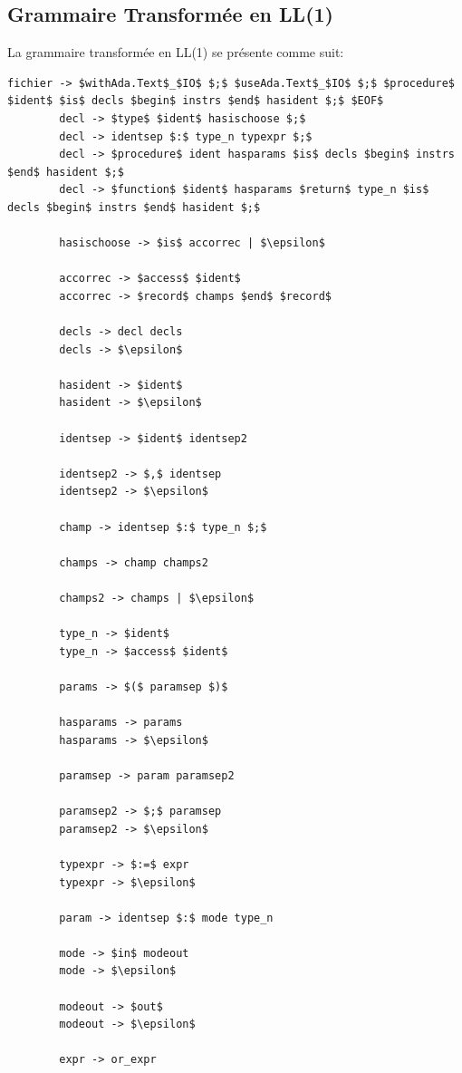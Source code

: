 \documentclass[french,a4paper]{article}
\begin{document}
    \subsection{Grammaire Transformée en LL(1)}\label{subsec:grammaire-transformee-en-ll(1)}
    La grammaire transformée en LL(1) se présente comme suit:
    \begin{lstlisting}[label={lst:lstlisting9}]
        fichier -> $withAda.Text$_$IO$ $;$ $useAda.Text$_$IO$ $;$ $procedure$ $ident$ $is$ decls $begin$ instrs $end$ hasident $;$ $EOF$
        decl -> $type$ $ident$ hasischoose $;$
        decl -> identsep $:$ type_n typexpr $;$
        decl -> $procedure$ ident hasparams $is$ decls $begin$ instrs $end$ hasident $;$
        decl -> $function$ $ident$ hasparams $return$ type_n $is$ decls $begin$ instrs $end$ hasident $;$

        hasischoose -> $is$ accorrec | $\epsilon$

        accorrec -> $access$ $ident$
        accorrec -> $record$ champs $end$ $record$

        decls -> decl decls
        decls -> $\epsilon$

        hasident -> $ident$
        hasident -> $\epsilon$

        identsep -> $ident$ identsep2

        identsep2 -> $,$ identsep
        identsep2 -> $\epsilon$

        champ -> identsep $:$ type_n $;$

        champs -> champ champs2

        champs2 -> champs | $\epsilon$

        type_n -> $ident$
        type_n -> $access$ $ident$

        params -> $($ paramsep $)$

        hasparams -> params
        hasparams -> $\epsilon$

        paramsep -> param paramsep2

        paramsep2 -> $;$ paramsep
        paramsep2 -> $\epsilon$

        typexpr -> $:=$ expr
        typexpr -> $\epsilon$

        param -> identsep $:$ mode type_n

        mode -> $in$ modeout
        mode -> $\epsilon$

        modeout -> $out$
        modeout -> $\epsilon$

        expr -> or_expr


\end{lstlisting}
\end{document}
